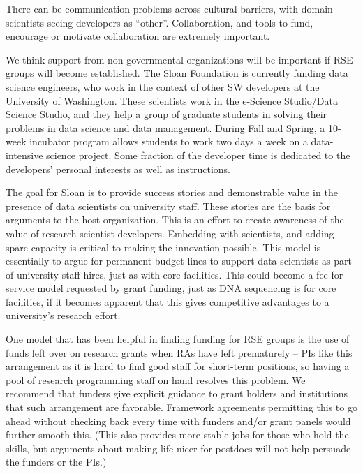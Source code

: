 There can be communication problems across cultural barriers, with domain
scientists seeing developers as ``other''. Collaboration, and tools to fund,
encourage or motivate collaboration are extremely important. 

We think support from non-governmental organizations will be important if RSE
groups will become established. The Sloan Foundation is currently funding data
science engineers, who work in the context of other SW developers at the University
of Washington. These scientists work in the e-Science Studio/Data Science
Studio, and they help a group of graduate students in solving their problems in
data science and data management. During Fall and Spring, a 10-week incubator
program allows students to work two days a week on a data-intensive
science project. Some fraction of the developer time is dedicated to the
developers' personal interests as well as instructions.

The goal for Sloan is to provide success stories and demonstrable value
in the presence of data scientists on university staff. These stories are the
basis for arguments to the host organization. This is an effort to create
awareness of the value of research scientist developers. Embedding with
scientists, and adding spare capacity is critical to making the innovation
possible. This model is essentially to argue for permanent budget lines to
support data scientists as part of university staff hires, just as with core
facilities. This could become a fee-for-service model requested by grant
funding, just as DNA sequencing is for core facilities, if it becomes apparent
that this gives competitive advantages to a university's research effort.

One model that has been helpful in finding funding for RSE groups is the use of
funds left over on research grants when RAs have left prematurely -- PIs like
this arrangement as it is hard to find good staff for short-term positions, so
having a pool of research programming staff on hand resolves this problem. We
recommend that funders give explicit guidance to grant holders and institutions
that such arrangement are favorable. Framework agreements permitting this to go
ahead without checking back every time with funders and/or grant panels would
further smooth this. (This also provides more stable jobs for those who hold
the skills, but arguments about making life nicer for postdocs will not help
persuade the funders or the PIs.)

